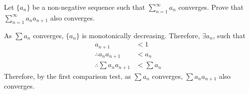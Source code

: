 \documentclass[fleqn, a4paper, 12pt, oneside]{amsart}
\theoremstyle{definition}
\theoremstyle{theorem}
\begin{document}
\begin{question}
	Let $\{a_n\}$ be a non-negative sequence such that $\sum\limits_{n = 1}^{\infty} a_n$ converges.
	Prove that $\sum\limits_{n = 1}^{\infty} a_n a_{n + 1}$ also converges.
\end{question}

\begin{solution}
	As $\sum a_n$ converges, $\{a_n\}$ is monotonically decreasing.
	Therefore, $\exists a_n$, such that 
	\begin{align*}
		a_{n + 1}                     & < 1   \\
		\therefore a_n a_{n + 1}      & < a_n \\
		\therefore \sum a_n a_{n + 1} & < \sum a_n
	\end{align*}
	Therefore, by the first comparison test, as $\sum a_n$ converges, $\sum a_n a_{n + 1}$ also converges.
\end{solution}
\end{document}

